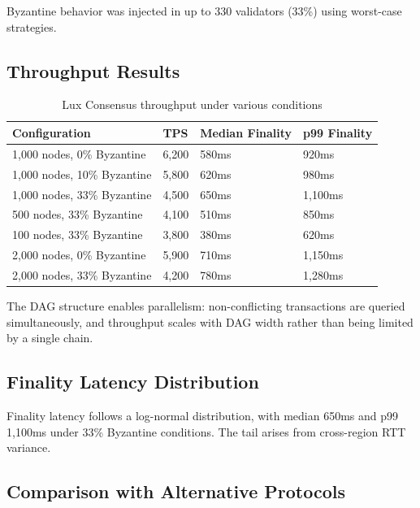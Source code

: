 \documentclass[11pt,a4paper]{article}
\begin{document}
Byzantine behavior was injected in up to 330 validators (33\%) using worst-case strategies.

\subsection{Throughput Results}

\begin{table}[h]
\centering
\caption{Lux Consensus throughput under various conditions}
\label{tab:throughput}
\begin{tabular}{@{}llll@{}}
\toprule
Configuration & TPS & Median Finality & p99 Finality \\
\midrule
1,000 nodes, 0\% Byzantine & 6,200 & 580ms & 920ms \\
1,000 nodes, 10\% Byzantine & 5,800 & 620ms & 980ms \\
1,000 nodes, 33\% Byzantine & 4,500 & 650ms & 1,100ms \\
500 nodes, 33\% Byzantine & 4,100 & 510ms & 850ms \\
100 nodes, 33\% Byzantine & 3,800 & 380ms & 620ms \\
2,000 nodes, 0\% Byzantine & 5,900 & 710ms & 1,150ms \\
2,000 nodes, 33\% Byzantine & 4,200 & 780ms & 1,280ms \\
\bottomrule
\end{tabular}
\end{table}

The DAG structure enables parallelism: non-conflicting transactions are queried simultaneously,
and throughput scales with DAG width rather than being limited by a single chain.

\subsection{Finality Latency Distribution}

Finality latency follows a log-normal distribution, with median 650ms and p99 1,100ms under
33\% Byzantine conditions. The tail arises from cross-region RTT variance.

\subsection{Comparison with Alternative Protocols}
\end{document}
